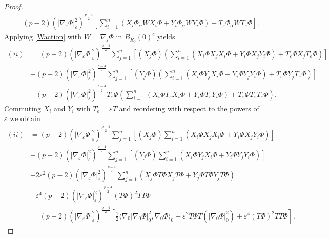 \documentclass[10pt,a4paper]{amsart}
\newcommand{\eT}{T_{\eps}}
\newcommand{\egrad}{\nabla_{\eps}}
\newcommand{\eps}{\varepsilon}
\newcommand{\scal}[2]{\langle {#1},{#2}\rangle}
\begin{document}
\begin{proof}
\begin{equation}
\begin{aligned}
&= (p-2) \left(|\egrad \Phi|_\varepsilon^2 \right)^{\tfrac{p-4}{2}} \left[ \sum_{i=1}^{n} \left( X_i \Phi_\alpha WX_i \Phi + Y_i \Phi_\alpha WY_i \Phi \right) + \eT \Phi_\alpha W\eT \Phi \right].
\end{aligned}
\end{equation}
Applying \eqref{Waction} with $W=\nabla_\varepsilon \Phi$ in $B_{R_0}(0)^c$ yields 
\begin{equation*}
\begin{aligned}
(ii) &= (p-2) \left(|\egrad \Phi|_\varepsilon^2 \right)^{\tfrac{p-4}{2}} \sum_{j=1}^{n}\left[(X_j \Phi)\left(\sum_{i=1}^{n} (X_i\Phi X_j X_i \Phi + Y_i \Phi X_j Y_i \Phi) + \eT \Phi X_j \eT \Phi \right)\right]\\
&+ (p-2) \left(|\egrad \Phi|_\varepsilon^2 \right)^{\tfrac{p-4}{2}}\sum_{j=1}^{n}\left[(Y_j \Phi) \left(\sum_{i=1}^{n}(X_i \Phi Y_j X_i \Phi + Y_i \Phi Y_j Y_i \Phi )+ \eT \Phi Y_j \eT \Phi\right)\right]\\
&+ (p-2) \left(|\egrad \Phi|_\varepsilon^2 \right)^{\tfrac{p-4}{2}} \eT \Phi \left( \sum_{i=1}^{n}(X_i \Phi \eT X_i \Phi + Y_i \Phi \eT Y_i \Phi) + \eT \Phi \eT \eT \Phi \right).
\end{aligned}
\end{equation*}
Commuting $X_i$ and $Y_i$ with $T_\varepsilon=\varepsilon T$ and reordering with respect to the powers of $\eps$ we obtain
\begin{equation}
\label{(ii)}
\begin{aligned}
(ii)&= (p-2)\left(|\egrad \Phi|_\varepsilon^2 \right)^{\tfrac{p-4}{2}} \sum_{j=1}^{n}\left[(X_j \Phi)\sum_{i=1}^{n} (X_i\Phi X_j X_i \Phi + Y_i \Phi X_j Y_i \Phi) \right]\\
&+ (p-2) \left(|\egrad \Phi|_\varepsilon^2 \right)^{\tfrac{p-4}{2}}\sum_{j=1}^{n}\left[ (Y_j \Phi) \sum_{i=1}^{n}(X_i \Phi Y_j X_i \Phi + Y_i \Phi Y_j Y_i \Phi ) \right]\\
&+2\eps^2 (p-2)\left(|\egrad \Phi|_\varepsilon^2 \right)^{\tfrac{p-4}{2}} \sum_{j=1}^{n}\left(X_j \Phi T\Phi  X_j T\Phi + Y_j \Phi T\Phi Y_j T\Phi \right) \\
&+ \eps^4 (p-2) \left(|\egrad \Phi|_\varepsilon^2 \right)^{\tfrac{p-4}{2}}  (T\Phi )^2 TT\Phi \\
&=  (p-2)\left(|\egrad \Phi|_\varepsilon^2 \right)^{\tfrac{p-4}{2}} \left[  \frac12\scal{\nabla_0 |\nabla_0 \Phi|^2_0}{\nabla_0 \Phi}_0 +\varepsilon^2 T\Phi T \left( |\nabla_0 \Phi|^2_0\right)+ \varepsilon^4(T\Phi)^2 TT\Phi \right] \,.
\end{aligned}
\end{equation}

\end{proof}
\end{document}
